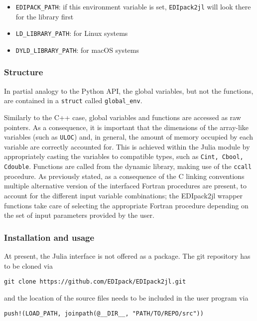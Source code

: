\documentclass[edipack_sp.tex]{subfiles}
\begin{document}
\begin{itemize}
\item {\tt EDIPACK\_PATH}: if this environment variable is set, {\tt EDIpack2jl} will look there for the library first
\item {\tt LD\_LIBRARY\_PATH}: for Linux systems
\item {\tt DYLD\_LIBRARY\_PATH}: for macOS systems
\end{itemize}

\subsubsection{Structure}

In partial analogy to the Python API, the global variables, but not the functions, are contained in a  {\tt struct} called {\tt global\_env}.

Similarly to the C++ case, global variables and functions are accessed as raw pointers. As a consequence, it is important that the dimensions of the array-like variables (such as {\tt ULOC}) and, in general, the amount of memory occupied by each variable are correctly accounted for. This is achieved within the Julia module by appropriately casting the variables to compatible types, such as {\tt  Cint, Cbool, Cdouble}.
Functions are called from the dynamic library, making use of the {\tt  ccall} procedure. As previously stated, as a consequence of the C linking conventions multiple alternative version of the interfaced Fortran procedures are present, to account for the different input variable combinations; the EDIpack2jl wrapper functions take care of selecting the appropriate Fortran procedure depending on the set of input parameters provided by the user.

\subsubsection{Installation and usage}

At present, the \NAME Julia interface is not offered as a package. The git repository has to be cloned via

\begin{lstlisting}[style=mybash]
git clone https://github.com/EDIpack/EDIpack2jl.git
\end{lstlisting}
%
and the location of the source files needs to be included in the user program via
\begin{lstlisting}[style=myjulia]
push!(LOAD_PATH, joinpath(@__DIR__, "PATH/TO/REPO/src"))
\end{lstlisting}
\end{document}
